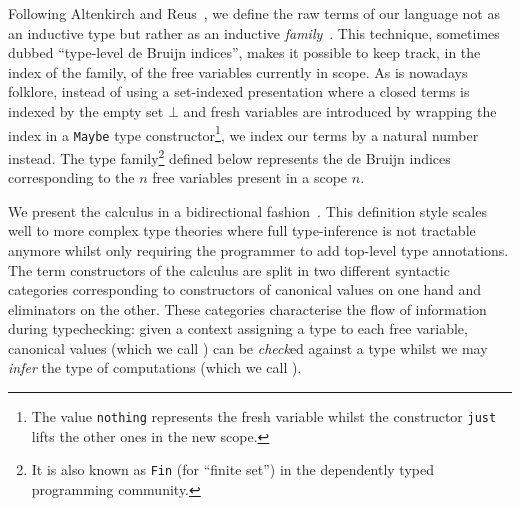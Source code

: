 \documentclass[a4paper,UKenglish]{lipics-v2016}
\begin{document}
Following Altenkirch and Reus~\cite{altenkirch1999monadic},
we define the raw terms of our language not as an inductive
type but rather as an inductive \emph{family}~\cite{dybjer1994inductive}.
This technique, sometimes dubbed ``type-level de Bruijn indices'',
makes it possible to keep track, in the index of the family, of the
free variables currently in scope. As is nowadays folklore, instead of
using a set-indexed presentation where a closed terms is indexed by
the empty set $⊥$ and fresh variables are introduced by wrapping
the index in a \texttt{Maybe} type constructor\footnote{The value
\texttt{nothing} represents the fresh variable whilst the constructor
\texttt{just} lifts the other ones in the new scope.}, we index
our terms by a natural number instead. The
\Var{} type family\footnote{It is also known as \texttt{Fin} (for
``finite set'') in the dependently typed programming community.}
defined below represents the de Bruijn indices~\cite{debruijn1972lambda}
corresponding to the $n$ free variables present in a scope $n$.


We present the calculus in a bidirectional fashion~\cite{pierce2000local}.
This definition style scales well to more complex type theories where full
type-inference is not tractable anymore whilst only requiring the programmer
to add top-level type annotations. The term constructors of the calculus are
split in two different syntactic categories corresponding to constructors
of canonical values on one hand and eliminators on the other. These
categories characterise the flow of information during typechecking: given a
context assigning a type to each free variable, canonical values (which we call
\Checkable{}) can be \emph{check}ed against a type whilst we may \emph{infer}
the type of computations (which we call \Inferable{}).
\end{document}
